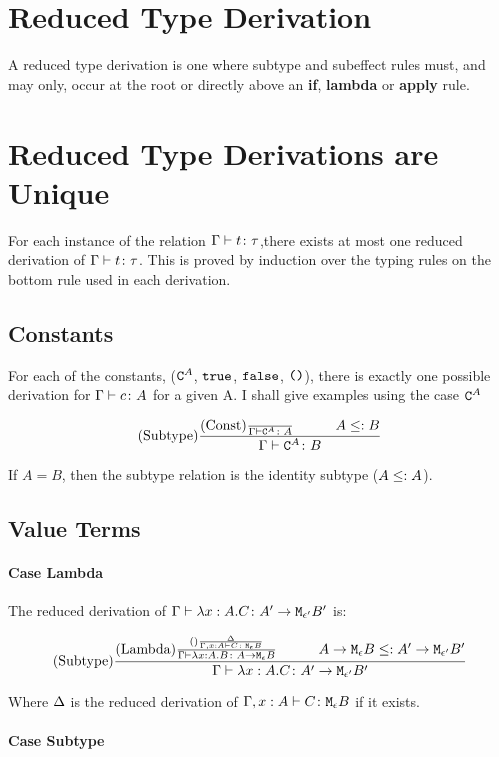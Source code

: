 \documentclass{report}
\begin{document}
    \section{Reduced Type Derivation}
    A reduced type derivation is one where subtype and subeffect rules must, and may only, occur at the root or directly above an \textbf{if}, \textbf{lambda} or \textbf{apply} rule.

    \section{Reduced Type Derivations are Unique}
    For each instance of the relation $\Gamma \vdash t \colon \tau$,there exists at most one reduced derivation of  $\Gamma \vdash t \colon \tau$. This is proved by induction over the typing rules on the bottom rule used in each derivation.

    \subsection{Constants}
    For each of the constants, ($\texttt{C}^{A}$, $\texttt{true}$, $\texttt{false}$, $\texttt{()}$), there is exactly one possible derivation for $\Gamma \vdash c \colon A$ for a given A. I shall give examples using the case $\texttt{C}^{A}$


    $$
        \treerule{Subtype}{\truleconst\s\s A \subtype B}{\gtyperelation{\const{A}}{B}}
    $$

    If $A = B$, then the subtype relation is the identity subtype ($A \leq: A$).

    \subsection{Value Terms}
    \paragraph{Case Lambda}
    The reduced derivation of $\Gamma \vdash \lambda x : A. C \colon A' \rightarrow \texttt{M}_{\epsilon'}{B'}$ is:


    $$
    \treerule{Subtype}
    {\treerule{Lambda}{\treerule{}{\D}{\typerelation{\gax}{C}{\meb}}}
    {
        \gtyperelation{\lam{x}{A}{B}}{\lamtype{A}{\e}{B}}}
        \s\s
        \lamtype{A}{\e}{B} \subtype \lamtype{A'}{\e'}{B'}
    }{
       \gtyperelation{\lam{x}{A}{C}}{\lamtype{A'}{\e'}{B'}} 
    }
    $$

    Where $\Delta$ is the reduced derivation of $\Gamma, x: A \vdash C \colon \texttt{M}_{\epsilon}{B}$ if it exists.

    \paragraph{Case Subtype}
\end{document}

